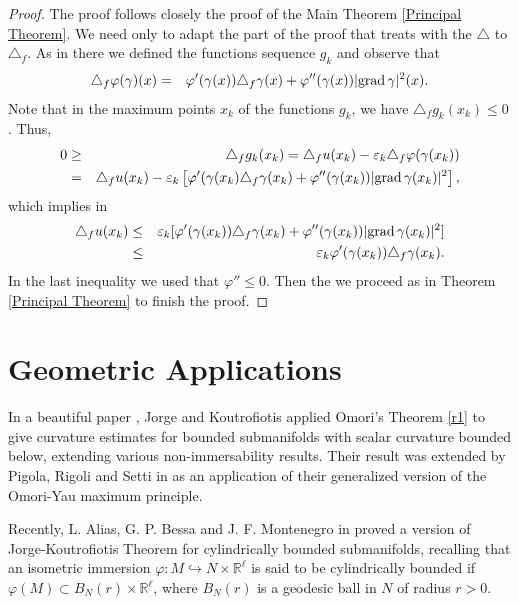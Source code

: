 \documentclass[a4paper]{amsart}
\begin{document}
\begin{proof}
The proof follows closely the  proof of the Main Theorem \ref{Principal Theorem}. We need only to adapt the part of the proof that treats with the $\triangle$ to $\triangle_{f}$. As in there we defined the functions sequence $ g_k $ and observe that
\begin{eqnarray*}
\triangle_{f}\varphi(\gamma)(x) &=&  \varphi'(\gamma(x))\triangle_{f}\gamma(x) + \varphi''(\gamma(x))\vert {{{\rm{grad}\,}}} \gamma\vert^2(x) .
\end{eqnarray*}
Note that in the maximum points $ x_k $ of the functions $ g_k $, we have $ \triangle_{f}g_{k}(x_{k}) \leq 0 $. Thus,
\begin{eqnarray*}
0 &\geq & \triangle_{f}g_{k}(x_k) = \triangle_{f}u(x_k) - \varepsilon_{k}\triangle_{f}\varphi(\gamma(x_{k})) \\
&=& \triangle_{f}u(x_k) - \varepsilon_{k}\left[\varphi'(\gamma(x_{k})\triangle_{f}\gamma(x_k) + \varphi''(\gamma(x_k))\vert{{{\rm{grad}\,}}} \gamma(x_k)\vert^2\right],
\end{eqnarray*}
which implies in
\begin{eqnarray*}
\triangle_{f}u(x_k) &\leq & \varepsilon_{k}[\varphi'(\gamma(x_k))\triangle_{f}\gamma(x_k) + \varphi''(\gamma(x_k))\vert{{{\rm{grad}\,}}} \gamma(x_k)\vert^2] \\
&\leq & \varepsilon_{k}\varphi'(\gamma(x_k))\triangle_{f}\gamma(x_k).
\end{eqnarray*}
In the last inequality we used that $\varphi''\leq 0$. Then the we proceed as in Theorem \ref{Principal Theorem} to finish the proof.
\end{proof}

\vspace{.2mm}

\section{Geometric Applications}In a beautiful paper \cite{jorge-koutrofiotis}, Jorge and Koutrofiotis  applied   Omori's Theorem \eqref{r1} to give curvature estimates for bounded submanifolds with scalar curvature bounded below, extending various non-immersability results. Their result was extended by Pigola, Rigoli and Setti in \cite{prs-memoirs} as an application of their generalized version of the Omori-Yau maximum principle.

Recently, L. Alias, G. P. Bessa and J. F. Montenegro in \cite{alias-bessa-montenegro} proved a  version of Jorge-Koutrofiotis Theorem for cylindrically bounded submanifolds, recalling that an isometric immersion $\varphi \colon M\hookrightarrow N\times \mathbb{R}^{\ell}$ is said to be cylindrically bounded if $\varphi (M)\subset B_{N}(r)\times \mathbb{R}^{\ell}$, where $B_{N}(r)$ is a geodesic ball in $N$ of radius $r>0$.
\end{document}
